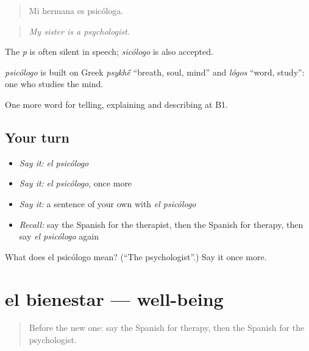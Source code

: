 \begin{quote}
Mi hermana es psicóloga.
\end{quote}

\begin{quote}
\emph{My sister is a psychologist.}
\end{quote}

The \emph{p} is often silent in speech; \emph{sicólogo} is also accepted.

\begin{cousinweb}
\emph{psicólogo} is built on Greek \emph{psykh\'{\={e}}} \textquotedblleft{}breath, soul, mind\textquotedblright{} and \emph{lógos} \textquotedblleft{}word, study\textquotedblright{}: one who studies the mind.
\end{cousinweb}

\begin{grammarlens}[title={What you've built}]
One more word for telling, explaining and describing at B1.
\end{grammarlens}

\subsection*{Your turn}
\begin{itemize}
\raggedright
  \item \emph{Say it:} \emph{el psicólogo}
  \item \emph{Say it:} \emph{el psicólogo}, once more
  \item \emph{Say it:} a sentence of your own with \emph{el psicólogo}
  \item \emph{Recall:} say the Spanish for the therapist, then the Spanish for therapy, then say \emph{el psicólogo} again
\end{itemize}

\begin{tcolorbox}[breakable,colback=teal!4,colframe=teal!35!black,title={Before you move on}]
What does el psicólogo mean? (\textquotedblleft{}The psychologist\textquotedblright{}.) Say it once more.
\end{tcolorbox}
\section[el bienestar]{el bienestar — well-being}

\label{lesson:ES-C743-bienestar}



\begin{quote}
Before the new one: say the Spanish for therapy, then the Spanish for the psychologist.
\end{quote}

